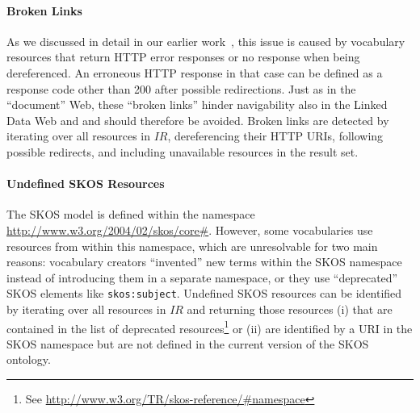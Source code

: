 \paragraph{Broken Links}

As we discussed in detail in our earlier work~\cite{Popitsch:2010:DHB:1772690.1772768}, this issue is caused by vocabulary resources that return HTTP error responses or no response when being dereferenced. An erroneous HTTP response in that case can be defined as a response code other than 200 after possible redirections. Just as in the ``document'' Web, these ``broken links'' hinder navigability also in the Linked Data Web and and should therefore be avoided. 
Broken links are detected by iterating over all resources in $IR$, dereferencing their HTTP URIs, following possible redirects, and including unavailable resources in the result set.

\paragraph{Undefined SKOS Resources}

The SKOS model is defined within the namespace \url{http://www.w3.org/2004/02/skos/core#}. However, some vocabularies use resources from within this namespace, which are unresolvable for two main reasons: vocabulary creators ``invented'' new terms within the SKOS namespace instead of introducing them in a separate namespace, or they use ``deprecated'' SKOS elements like \texttt{skos:subject}.
Undefined SKOS resources can be identified by iterating over all resources in $IR$ and returning those resources (i) that are contained in the list of deprecated resources\footnote{See \url{http://www.w3.org/TR/skos-reference/#namespace}} or (ii) are identified by a URI in the SKOS namespace but are not defined in the current version of the SKOS ontology.
